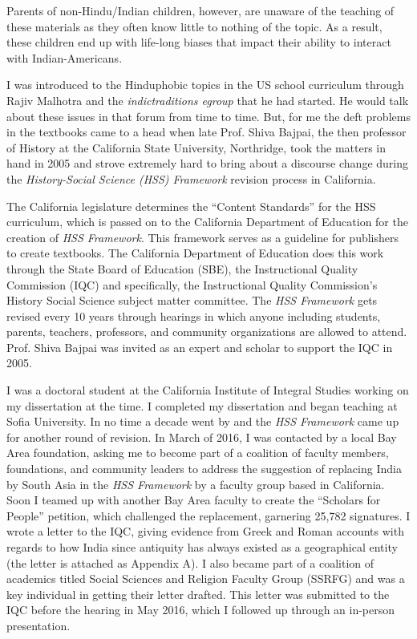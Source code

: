 Parents of non-Hindu/Indian children, however, are unaware of the teaching of these materials as they often know little to nothing of the topic. As a result, these children end up with life-long biases that impact their ability to interact with Indian-Americans.

I was introduced to the Hinduphobic topics in the US school curriculum through Rajiv Malhotra and the \textit{indictraditions egroup} that he had started. He would talk about these issues in that forum from time to time. But, for me the deft problems in the textbooks came to a head when late Prof. Shiva Bajpai, the then professor of History at the California State University, Northridge, took the matters in hand in 2005 and strove extremely hard to bring about a discourse change during the \textit{History-Social Science (HSS) Framework} revision process in California. 

The California legislature determines the “Content Standards” for the HSS curriculum, which is passed on to the California Department of Education for the creation of \textit{HSS Framework}. This framework serves as a guideline for publishers to create textbooks. The California Department of Education does this work through the State Board of Education (SBE), the Instructional Quality Commission (IQC) and specifically, the Instructional Quality Commission’s History Social Science subject matter committee. The \textit{HSS Framework} gets revised every 10 years through hearings in which anyone including students, parents, teachers, professors, and community organizations are allowed to attend. Prof. Shiva Bajpai was invited as an expert and scholar to support the IQC in 2005. 

I was a doctoral student at the California Institute of Integral Studies working on my dissertation at the time. I completed my dissertation and began teaching at Sofia University. In no time a decade went by and the \textit{HSS Framework} came up for another round of revision. In March of 2016, I was contacted by a local Bay Area foundation, asking me to become part of a coalition of faculty members, foundations, and community leaders to address the suggestion of replacing India by South Asia in the \textit{HSS Framework} by a faculty group based in California. Soon I teamed up with another Bay Area faculty to create the “Scholars for People” petition, which challenged the replacement, garnering 25,782 signatures. I wrote a letter to the IQC, giving evidence from Greek and Roman accounts with regards to how India since antiquity has always existed as a geographical entity (the letter is attached as Appendix A). I also became part of a coalition of academics titled Social Sciences and Religion Faculty Group (SSRFG) and was a key individual in getting their letter drafted. This letter was submitted to the IQC before the hearing in May 2016, which I followed up through an in-person presentation. 

